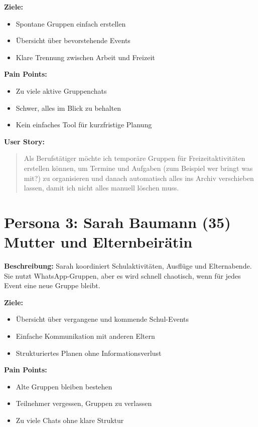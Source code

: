 \documentclass[11pt,a4paper]{article}
\begin{document}
\textbf{Ziele:}
\begin{itemize}
  \item Spontane Gruppen einfach erstellen
  \item Übersicht über bevorstehende Events
  \item Klare Trennung zwischen Arbeit und Freizeit
\end{itemize}

\textbf{Pain Points:}
\begin{itemize}
  \item Zu viele aktive Gruppenchats
  \item Schwer, alles im Blick zu behalten
  \item Kein einfaches Tool für kurzfristige Planung
\end{itemize}

\textbf{User Story:}
\begin{quote}
Als Berufstätiger möchte ich temporäre Gruppen für Freizeitaktivitäten erstellen können, um Termine und Aufgaben (zum Beispiel wer bringt was mit?) zu organisieren und danach automatisch alles ins Archiv verschieben lassen, damit ich nicht alles manuell löschen muss.
\end{quote}

\section*{Persona 3: Sarah Baumann (35) Mutter und Elternbeirätin}
\textbf{Beschreibung:} Sarah koordiniert Schulaktivitäten, Ausflüge und Elternabende. Sie nutzt WhatsApp-Gruppen, aber es wird schnell chaotisch, wenn für jedes Event eine neue Gruppe bleibt.

\textbf{Ziele:}
\begin{itemize}
  \item Übersicht über vergangene und kommende Schul-Events
  \item Einfache Kommunikation mit anderen Eltern
  \item Strukturiertes Planen ohne Informationsverlust
\end{itemize}

\textbf{Pain Points:}
\begin{itemize}
  \item Alte Gruppen bleiben bestehen
  \item Teilnehmer vergessen, Gruppen zu verlassen
  \item Zu viele Chats ohne klare Struktur
\end{itemize}
\end{document}
